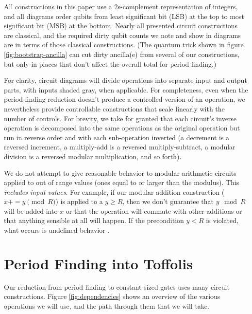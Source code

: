 \documentclass[twocolumn]{article}
\begin{document}
All constructions in this paper use a 2s-complement representation of integers, and all diagrams order qubits from least significant bit (LSB) at the top to most significant bit (MSB) at the bottom.
Nearly all presented circuit constructions are classical, and the required dirty qubit counts we note and show in diagrams are in terms of those classical constructions.
(The quantum trick shown in figure \ref{fig:bootstrap-ancilla} can cut dirty ancilla(e) from several of our constructions, but only in places that don't affect the overall total for period-finding.)

For clarity, circuit diagrams will divide operations into separate input and output parts, with inputs shaded gray, when applicable.
For completeness, even when the period finding reduction doesn't produce a controlled version of an operation, we nevertheless provide controllable constructions that scale linearly with the number of controls.
For brevity, we take for granted that each circuit's inverse operation is decomposed into the same operations as the original operation but run in reverse order and with each sub-operation inverted (a decrement is a reversed increment, a multiply-add is a reversed multiply-subtract, a modular division is a reversed modular multiplication, and so forth).

We do not attempt to give reasonable behavior to modular arithmetic circuits applied to out of range values (ones equal to or larger than the modulus).
This {\em includes input values}.
For example, if our modular addition construction ($x \mathrel{{+}{=}} y \pmod{R}$) is applied to a $y \geq R$, then we don't guarantee that $y \mod R$ will be added into $x$ or that the operation will commute with other additions or that anything sensible at all will happen.
If the precondition $y < R$ is violated, what occurs is undefined behavior \cite{c11}.


\section{Period Finding into Toffolis} \label{sec:construct}

Our reduction from period finding to constant-sized gates uses many circuit constructions.
Figure \ref{fig:dependencies} shows an overview of the various operations we will use, and the path through them that we will take.
\end{document}
